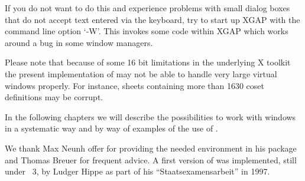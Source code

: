 If you do not want to do this and experience problems with small
dialog boxes that do not accept text entered via the keyboard, try to
start up XGAP with the command line option `-W'. This invokes some
code within XGAP which works around a bug in some window managers.

Please note that because of some 16 bit limitations in the underlying
X toolkit the present implementation of {\XGAP} may not be able to
handle very large virtual windows properly. For instance, sheets
containing more than 1630 coset definitions may be corrupt.

In the following chapters we will describe the possibilities to work
with windows in a systematic way and by way of examples of the use of
{\ITC}.



We thank Max Neunh{ o}ffer for providing the needed
environment in his package {\XGAP} and Thomas Breuer for frequent
advice. A first version of {\ITC} was implemented, still under
{\GAP}~3, by Ludger Hippe as part of his ``Staatsexamensarbeit'' in
1997.



